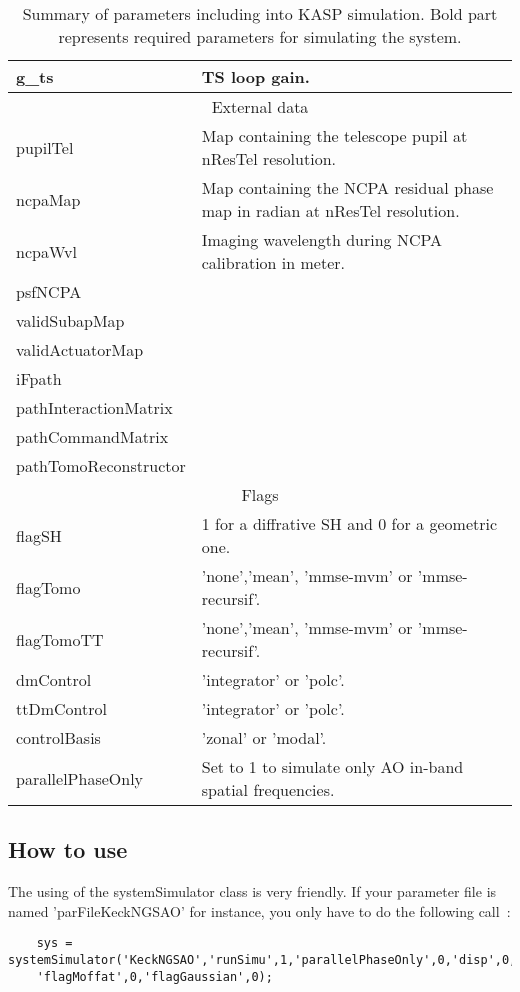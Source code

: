 \documentclass[12pt]{article}
\begin{document}
\begin{table}[H]
\begin{scriptsize}
\begin{tabular}{p{2.5cm}p{7cm}}
	g\_ts          & TS loop gain.\\                                   
	\hline
	\multicolumn{2}{c}{External data} \\
	\hline      	
	pupilTel            & Map containing the telescope pupil at nResTel resolution.\\
	ncpaMap             & Map containing the NCPA residual phase map in radian at nResTel resolution.\\
	ncpaWvl             & Imaging wavelength during NCPA calibration in meter.\\
	psfNCPA & \\
	validSubapMap & \\
	validActuatorMap & \\
	iFpath & \\
	pathInteractionMatrix & \\
	pathCommandMatrix & \\
	pathTomoReconstructor & \\
	\hline
	\multicolumn{2}{c}{Flags} \\
	\hline 
	flagSH   & 1 for a diffrative SH and 0 for a geometric one.\\
	flagTomo & 'none','mean', 'mmse-mvm' or 'mmse-recursif'.\\
	flagTomoTT & 'none','mean', 'mmse-mvm' or 'mmse-recursif'.\\
	dmControl & 'integrator' or 'polc'.\\
	ttDmControl & 'integrator' or 'polc'.\\
	controlBasis & 'zonal' or 'modal'.\\
	parallelPhaseOnly & Set to 1 to simulate only AO in-band spatial frequencies.\\
\end{tabular}
\end{scriptsize}
\captionsetup{font=scriptsize}	
\caption{\scriptsize Summary of parameters including into KASP simulation. Bold part represents required parameters for simulating the system.}
\label{T:parfile}
\end{table}

\subsection{How to use}

The using of the systemSimulator class is very friendly. If your parameter file is named 'parFileKeckNGSAO' for instance, you only have to do the following call~:
\begin{verbatim}
	sys = systemSimulator('KeckNGSAO','runSimu',1,'parallelPhaseOnly',0,'disp',0,...
	'flagMoffat',0,'flagGaussian',0);
\end{verbatim}
\end{document}
